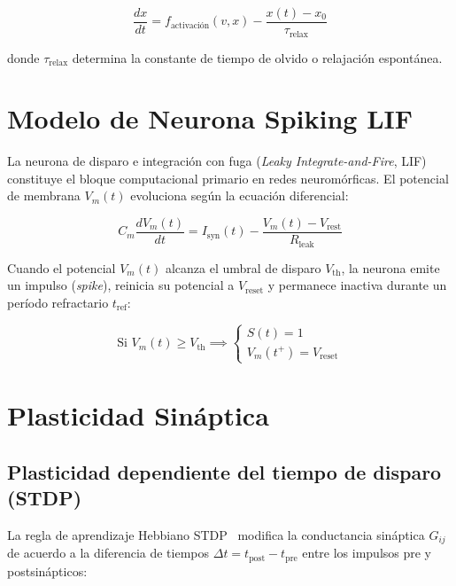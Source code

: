 \begin{equation}
\frac{dx}{dt} = f_{\text{activación}}(v, x) - \frac{x(t) - x_0}{\tau_{\mathrm{relax}}}
\label{eq:volatile-dxdt}
\end{equation}

donde $\tau_{\mathrm{relax}}$ determina la constante de tiempo de olvido o relajación espontánea.

\section{Modelo de Neurona Spiking LIF}
\label{sec:marco-lif}

La neurona de disparo e integración con fuga (\emph{Leaky Integrate-and-Fire}, LIF) constituye el bloque computacional primario en redes neuromórficas. El potencial de membrana $V_m(t)$ evoluciona según la ecuación diferencial:

\begin{equation}
C_m \frac{dV_m(t)}{dt} = I_{\mathrm{syn}}(t) - \frac{V_m(t) - V_{\mathrm{rest}}}{R_{\mathrm{leak}}}
\label{eq:lif-diffeq}
\end{equation}

Cuando el potencial $V_m(t)$ alcanza el umbral de disparo $V_{\mathrm{th}}$, la neurona emite un impulso (\emph{spike}), reinicia su potencial a $V_{\mathrm{reset}}$ y permanece inactiva durante un período refractario $t_{\mathrm{ref}}$:

\begin{equation}
\text{Si } V_m(t) \ge V_{\mathrm{th}} \implies 
\begin{cases}
S(t) = 1 \\
V_m(t^+) = V_{\mathrm{reset}}
\end{cases}
\label{eq:lif-spike}
\end{equation}

\section{Plasticidad Sináptica}
\label{sec:marco-plasticidad}

\subsection{Plasticidad dependiente del tiempo de disparo (STDP)}
\label{subsec:marco-stdp}

La regla de aprendizaje Hebbiano STDP~\cite{bi1998, jo2010} modifica la conductancia sináptica $G_{ij}$ de acuerdo a la diferencia de tiempos $\Delta t = t_{\mathrm{post}} - t_{\mathrm{pre}}$ entre los impulsos pre y postsinápticos:


